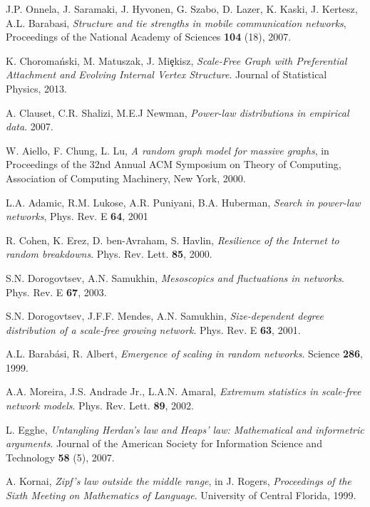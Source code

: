 \begin{thebibliography}{99}
  J.P. Onnela, J. Saramaki, J. Hyvonen, G. Szabo, D. Lazer, K. Kaski, J. Kertesz, A.L. Barabasi,
  \emph{Structure and tie strengths in mobile communication networks},
  Proceedings of the National Academy of Sciences \textbf{104} (18),
  2007.

  K. Choromański, M. Matuszak, J. Miȩkisz,
  \emph{Scale-Free Graph with Preferential Attachment and Evolving Internal Vertex Structure}.
  Journal of Statistical Physics,
  2013.

  A. Clauset, C.R. Shalizi, M.E.J Newman,
  \emph{Power-law distributions in empirical data}.
  2007.

  W. Aiello, F. Chung, L. Lu,
  \emph{A random graph model for massive graphs},
  in Proceedings of the 32nd Annual ACM Symposium on Theory of Computing,
  Association of Computing Machinery, New York,
  2000.

  L.A. Adamic, R.M. Lukose, A.R. Puniyani, B.A. Huberman,
  \emph{Search in power-law networks},
  Phys. Rev. E \textbf{64},
  2001

  R. Cohen, K. Erez, D. ben-Avraham, S. Havlin,
  \emph{Resilience of the Internet to random breakdowns}.
  Phys. Rev. Lett. \textbf{85},
  2000.

  S.N. Dorogovtsev, A.N. Samukhin,
  \emph{Mesoscopics and fluctuations in networks}.
  Phys. Rev. E \textbf{67},
  2003.

  S.N. Dorogovtsev, J.F.F. Mendes, A.N. Samukhin,
  \emph{Size-dependent degree distribution of a scale-free growing network}.
  Phys. Rev. E \textbf{63},
  2001.

  A.L. Barabási, R. Albert,
  \emph{Emergence of scaling in random networks}.
  Science \textbf{286},
  1999.
  
  A.A. Moreira, J.S. Andrade Jr., L.A.N. Amaral,
  \emph{Extremum statistics in scale-free network models}.
  Phys. Rev. Lett. \textbf{89},
  2002.
  
  L. Egghe,
  \emph{Untangling Herdan's law and Heaps' law: Mathematical and informetric arguments}.
  Journal of the American Society for Information Science and Technology \textbf{58} (5),
  2007.

  A. Kornai,
  \emph{Zipf's law outside the middle range}, in J. Rogers, \emph{Proceedings of the Sixth Meeting on Mathematics of Language}.
  University of Central Florida,
  1999.


\end{thebibliography}

